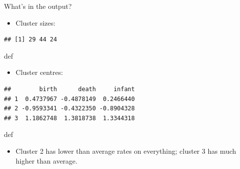 \documentclass[ignorenonframetext,]{beamer}
\newenvironment{Shaded}{\begin{snugshade}}{\end{snugshade}}
\newcommand{\NormalTok}[1]{#1}
\newcommand{\OperatorTok}[1]{\textcolor[rgb]{0.81,0.36,0.00}{\textbf{#1}}}
\providecommand{\tightlist}{%
  \setlength{\itemsep}{0pt}\setlength{\parskip}{0pt}}
\begin{document}
\begin{frame}[fragile]{What's in the output?}
\protect\hypertarget{whats-in-the-output}{}

\begin{itemize}
\tightlist
\item
  Cluster sizes:
\end{itemize}

\begin{Shaded}
\end{Shaded}

\begin{verbatim}
## [1] 29 44 24
\end{verbatim}

def

\begin{itemize}
\tightlist
\item
  Cluster centres:
\end{itemize}

\begin{Shaded}
\end{Shaded}

\begin{verbatim}
##        birth      death     infant
## 1  0.4737967 -0.4878149  0.2466440
## 2 -0.9593341 -0.4322350 -0.8904328
## 3  1.1862748  1.3818738  1.3344318
\end{verbatim}

def

\begin{itemize}
\tightlist
\item
  Cluster 2 has lower than average rates on everything; cluster 3 has
  much higher than average.
\end{itemize}

\end{frame}
\end{document}
